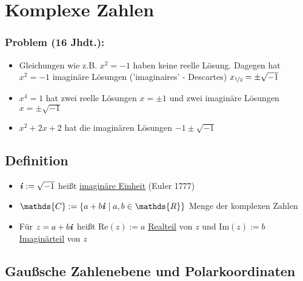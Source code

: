 \documentclass[12pt,titlepage, pdf]{article}
\newcommand{\R}{\mathds{R}}
\newcommand{\uline}[1]{\underline{#1}}
\renewcommand{\Re}[1]{\text{Re}(#1)}
\renewcommand{\Im}[1]{\text{Im}(#1)}
\renewcommand{\i}{\textbf{\textit{i}}}
\renewcommand{\>}{\rightarrow}
\renewcommand{\*}{\cdot}
\begin{document}
	\section{Komplexe Zahlen}
	\label{5}
	\subsubsection*{Problem (16 Jhdt.):} 
	\begin{itemize}
		\item Gleichungen wie z.B. $x^2 = -1$ haben keine reelle Lösung. Dagegen hat\\ $x^2 = -1$ imaginäre Lösungen ('imaginaires' - Descartes) $x_{\nicefrac{1}{2}} = \pm \sqrt{-1}$
		\item $x^4 = 1$ hat zwei reelle Lösungen $x = \pm 1$ und zwei imaginäre Lösungen $x = \pm \sqrt{-1}$
		\item $x^2 + 2x +2$ hat die imaginären Lösungen $-1 \pm \sqrt{-1}$
	\end{itemize}
	\subsection{Definition}
	\begin{itemize}
		\item $\i  := \sqrt{-1}$ heißt \uline{imaginäre Einheit} (Euler 1777)
		\item $\mathds{C} := \{a +b\i \mid a,b \in \R \}$ Menge der komplexen Zahlen
		\item Für $z = a +b\i$ heißt $\Re{z} :=a$ \uline{Realteil} von $z$ und $\Im{z} := b$ \uline{Imaginärteil} von $z$
	\end{itemize}
	\subsection*{Gaußsche Zahlenebene und Polarkoordinaten}
\end{document}
